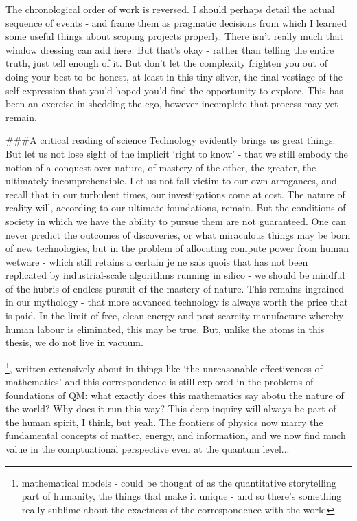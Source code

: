 The chronological order of work is reversed.
	I should perhaps detail the
actual sequence of events - and frame them as pragmatic decisions from
which I learned some useful things about scoping projects properly.
There isn't really much that window dressing can add here.
	But that's
okay - rather than telling the entire truth, just tell enough of it.
	But
don't let the complexity frighten you out of doing your best to be
honest, at least in this tiny sliver, the final vestiage of the
self-expression that you'd hoped you'd find the opportunity to explore.
This has been an exercise in shedding the ego, however incomplete that
process may yet remain.

\#\#\#A critical reading of science Technology evidently brings us great
things.
	But let us not lose sight of the implicit `right to know' - that
we still embody the notion of a conquest over nature, of mastery of the
other, the greater, the ultimately incomprehensible.
	Let us not fall
victim to our own arrogances, and recall that in our turbulent times,
our investigations come at cost.
	The nature of reality will, according
to our ultimate foundations, remain.
	But the conditions of society in
which we have the ability to pursue them are not guaranteed.
	One can
never predict the outcomes of discoveries, or what miraculous things may
be born of new technologies, but in the problem of allocating compute
power from human wetware - which still retains a certain je ne sais
quois that has not been replicated by industrial-scale algorithms
running in silico - we should be mindful of the hubris of endless
pursuit of the mastery of nature.
	This remains ingrained in our
mythology - that more advanced technology is always worth the price that
is paid.
	In the limit of free, clean energy and post-scarcity
manufacture whereby human labour is eliminated, this may be true.
	But,
unlike the atoms in this thesis, we do not live in vacuum.


\footnote{mathematical models - could be thought of as the quantitative storytelling part of humanity, the things that make it unique - and so there's something really sublime about the exactness of the correspondence with the world}, written extensively about in things like `the unreasonable effectiveness of mathematics' and this correspondence is still explored in the problems of foundations of QM: what exactly does this mathematics say abotu the nature of the world? Why does it run this way? This deep inquiry will always be part of the human spirit, I think, but yeah.
The frontiers of physics now marry the fundamental concepts of matter, energy, and information, and we now find much value in the comptuational perspective even at the quantum level...

